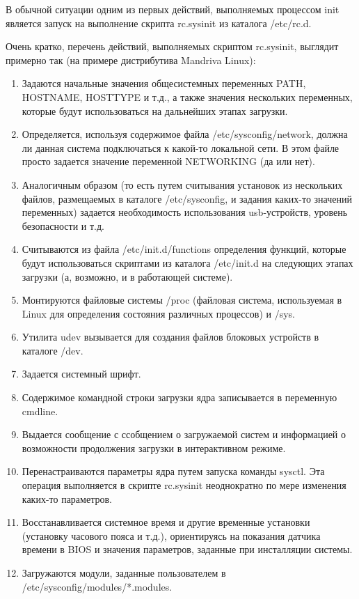 В обычной ситуации одним из первых действий, выполняемых процессом init является запуск на выполнение скрипта rc.sysinit из каталога /etc/rc.d.

Очень кратко, перечень действий, выполняемых скриптом rc.sysinit, выглядит примерно так (на примере дистрибутива Mandriva Linux):
\begin{enumerate}
\item Задаются начальные значения общесистемных переменных PATH, HOSTNAME, HOSTTYPE и т.д., а также значения нескольких переменных, которые будут использоваться на дальнейших этапах загрузки.
\item Определяется, используя содержимое файла /etc/sysconfig/network, должна ли данная система подключаться к какой-то локальной сети. В этом файле просто задается значение переменной NETWORKING (да или нет).
\item Аналогичным образом (то есть путем считывания установок из нескольких файлов, размещаемых в каталоге /etc/sysconfig, и задания каких-то значений переменных) задается необходимость использования usb-устройств, уровень безопасности и т.д.
\item Считываются из файла /etc/init.d/functions определения функций, которые будут использоваться скриптами из каталога /etc/init.d на следующих этапах загрузки (а, возможно, и в работающей системе).
\item Монтируются файловые системы /proc (файловая система, используемая в Linux для определения состояния различных процессов) и /sys.
\item Утилита udev вызывается для создания файлов блоковых устройств в каталоге /dev.
\item Задается системный шрифт.
\item Содержимое командной строки загрузки ядра записывается в переменную cmdline.
\item Выдается сообщение с ссобщением о загружаемой систем и информацией о возможности продолжения загрузки в интерактивном режиме.
\item Перенастраиваются параметры ядра путем запуска команды sysctl. Эта операция выполняется в скрипте rc.sysinit неоднократно по мере изменения каких-то параметров.
\item Восстанавливается системное время и другие временные установки (установку часового пояса и т.д.), ориентируясь на показания датчика времени в BIOS и значения параметров, заданные при инсталляции системы.
\item Загружаются модули, заданные пользователем в /etc/sysconfig/modules/*.modules.

\end{enumerate}
